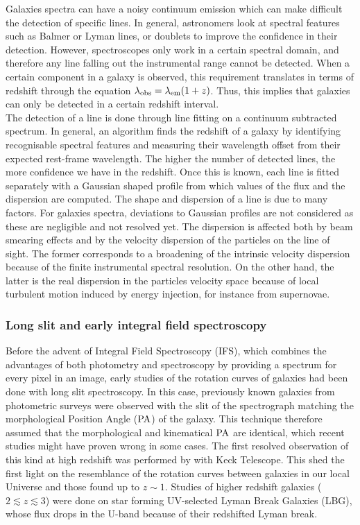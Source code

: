Galaxies spectra can have a noisy continuum emission which can make difficult the detection of specific lines. In general, astronomers look at spectral features such as Balmer or Lyman lines, or doublets to improve the confidence in their detection. However, spectroscopes only work in a certain spectral domain, and therefore any line falling out the instrumental range cannot be detected. When a certain component in a galaxy is observed, this requirement translates in terms of redshift through the equation $\lambda_{\rm{obs}} = \lambda_{\rm{em}} ( 1+ z)$. Thus, this implies that galaxies can only be detected in a certain redshift interval. \\

The detection of a line is done through line fitting on a continuum subtracted spectrum. In general, an algorithm finds the redshift of a galaxy by identifying recognisable spectral features and measuring their wavelength offset from their expected rest-frame wavelength. The higher the number of detected lines, the more confidence we have in the redshift. Once this is known, each line is fitted separately with a Gaussian shaped profile from which values of the flux and the dispersion are computed. The shape and dispersion of a line is due to many factors. For galaxies spectra, deviations to Gaussian profiles are not considered as these are negligible and not resolved yet. The dispersion is affected both by beam smearing effects and by the velocity dispersion of the particles on the line of sight. The former corresponds to a broadening of the intrinsic velocity dispersion because of the finite instrumental spectral resolution. On the other hand, the latter is the real dispersion in the particles velocity space because of local turbulent motion induced by energy injection, for instance from supernovae. \\


\subsubsection{Long slit and early integral field spectroscopy}
\label{subsubsec:MUSE-VLT}

Before the advent of Integral Field Spectroscopy (IFS), which combines the advantages of both photometry and spectroscopy by providing a spectrum for every pixel in an image, early studies of the rotation curves of galaxies had been done with long slit spectroscopy. In this case, previously known galaxies from photometric surveys were observed with the slit of the spectrograph matching the morphological Position Angle ($\rm{PA}$) of the galaxy. This technique therefore assumed that the morphological and kinematical $\rm{PA}$ are identical, which recent studies might have proven wrong in some cases. The first resolved observation of this kind at high redshift was performed by  with Keck Telescope. This shed the first light on the resemblance of the rotation curves between galaxies in our local Universe and those found up to $z \sim 1$. Studies of higher redshift galaxies ($2 \lesssim z \lesssim 3$) were done on star forming UV-selected Lyman Break Galaxies (LBG), whose flux drops in the U-band because of their redshifted Lyman break.  \\

